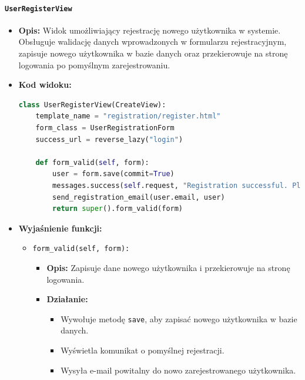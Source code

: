 \documentclass[12pt,a4paper,oneside]{article}
\theoremstyle{definition}
\numberwithin{equation}{section}
\begin{document}
\paragraph{\texttt{UserRegisterView}}
\begin{itemize}
    \item \textbf{Opis:} Widok umożliwiający rejestrację nowego użytkownika w systemie. Obsługuje walidację danych wprowadzonych w formularzu rejestracyjnym, zapisuje nowego użytkownika w bazie danych oraz przekierowuje na stronę logowania po pomyślnym zarejestrowaniu.
    \item \textbf{Kod widoku:}
    \begin{lstlisting}[language=Python, caption=UserRegisterView]
class UserRegisterView(CreateView):
    template_name = "registration/register.html"
    form_class = UserRegistrationForm
    success_url = reverse_lazy("login")

    def form_valid(self, form):
        user = form.save(commit=True)
        messages.success(self.request, "Registration successful. Please log in.")
        send_registration_email(user.email, user)
        return super().form_valid(form)
    \end{lstlisting}

    \item \textbf{Wyjaśnienie funkcji:}
    \begin{itemize}
        \item \texttt{form\_valid(self, form):}
        \begin{itemize}
            \item \textbf{Opis:} Zapisuje dane nowego użytkownika i przekierowuje na stronę logowania.
            \item \textbf{Działanie:}
            \begin{itemize}
                \item Wywołuje metodę \texttt{save}, aby zapisać nowego użytkownika w bazie danych.
                \item Wyświetla komunikat o pomyślnej rejestracji.
                \item Wysyła e-mail powitalny do nowo zarejestrowanego użytkownika.
            \end{itemize}
        \end{itemize}
    \end{itemize}
\end{itemize}
\end{document}
